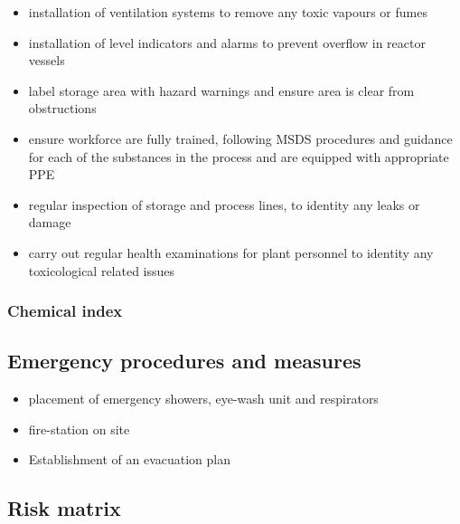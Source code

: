 \begin{itemize}
    \item installation of ventilation systems to remove any toxic vapours or fumes 
    \item installation of level indicators and alarms to prevent overflow in reactor vessels 
    \item label storage area with hazard warnings and ensure area is clear from obstructions
    \item ensure workforce are fully trained, following MSDS procedures and guidance for each of the substances in the process and are equipped with appropriate PPE 
    \item regular inspection of storage and process lines, to identity any leaks or damage
    \item carry out regular health examinations for plant personnel to identity any toxicological related issues
\end{itemize}

\subsubsection{Chemical index}

\subsection{Emergency procedures and measures}

\begin{itemize}
    \item placement of emergency showers, eye-wash unit and respirators
    \item fire-station on site 
    \item Establishment of an evacuation plan 
\end{itemize}




\subsection{Risk matrix}

